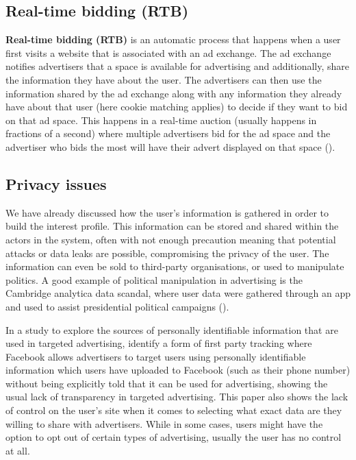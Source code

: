 \documentclass{l4proj}
\begin{document}
\subsection{Real-time bidding (RTB)}
\textbf{Real-time bidding (RTB)} is an automatic process that happens when a user first visits a website that is associated with an ad exchange. The ad exchange notifies advertisers that a space is available for advertising and additionally, share the information they have about the user. The advertisers can then use the information shared by the ad exchange along with any information they already have about that user (here cookie matching applies) to decide if they want to bid on that ad space. This happens in a real-time auction (usually happens in fractions of a second) where multiple advertisers bid for the ad space and the advertiser who bids the most will have their advert displayed on that space (\cite{RTB}).

\subsection{Privacy issues}
We have already discussed how the user's information is gathered in order to build the interest profile. This information can be stored and shared within the actors in the system, often with not enough precaution meaning that potential attacks or data leaks are possible, compromising the privacy of the user. The information can even be sold to third-party organisations, or used to manipulate politics. A good example of political manipulation in advertising is the Cambridge analytica data scandal, where user data were gathered through an app and used to assist presidential political campaigns (\cite{cambridge}).

In a study to explore the sources of personally identifiable information that are used in targeted advertising, \cite{Venkatadri2019} identify a form of first party tracking where Facebook allows advertisers to target users using personally identifiable information which users have uploaded to Facebook (such as their phone number) without being explicitly told that it can be used for advertising, showing the usual lack of transparency in targeted advertising. This paper also shows the lack of control on the user's site when it comes to selecting what exact data are they willing to share with advertisers. While in some cases, users might have the option to opt out of certain types of advertising, usually the user has no control at all.
\end{document}
